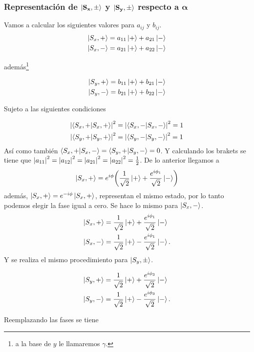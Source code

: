 \subsubsection{Representación de $\mathbf{\ket{S_x,\pm}}$ y $\mathbf{\ket{S_y, \pm}}$ respecto a $\mathbf{\alpha}$}
Vamos a calcular los siguientes valores para $a_{ij}$ y $b_{ij}$.
\begin{align*}
	\ket{S_{x} ,+} &= a_{11} \ket{+} + a_{21} \ket{-} \\
	\ket{S_{x} ,-} &= a_{21} \ket{+} + a_{22} \ket{-}
\end{align*}

además\footnote{a la base de $y$ le llamaremos $\gamma$.}

\begin{align*}
	\ket{S_{y} ,+} &= b_{11} \ket{+} + b_{21} \ket{-} \\
	\ket{S_{y} ,-} &= b_{21} \ket{+} + b_{22} \ket{-}
\end{align*}

Sujeto a las siguientes condiciones

\begin{align*}
	\abs{\braket{S_x, +}}^2 &= \abs{\braket{S_x, -}}^2 = 1 \\
	\abs{\braket{S_y, +}}^2 &= \abs{\braket{S_y, -}}^2 = 1
\end{align*}
Así como también $\braket{S_x,+}{S_x,-} = \braket{S_y,+}{S_y,-} = 0$. Y calculando los brakets se tiene que $\abs{a_{11}}^2 = \abs{a_{12}}^2 = \abs{a_{21}}^2 = \abs{a_{22}}^2 = \frac{1}{2}$. De lo anterior llegamos a
	$$ \ket{S_{x} ,+} = e^{i\phi} \qty(\frac{1}{\sqrt{2}} \ket{+} + \frac{e^{i\phi _1}}{\sqrt{2}} \ket{-}) $$
además, $\ket{S_{x} ,+} = e^{-i\phi} \ket{S_{x} ,+}$, representan el mismo estado, por lo tanto podemos elegir la fase igual a cero. Se hace lo mismo para $\ket{S_{x} ,-}$.
\begin{align}
	\ket{S_{x} ,+} &= \frac{1}{\sqrt{2}} \ket{+} + \frac{e^{i\phi _1}}{\sqrt{2}} \ket{-} \\
	\ket{S_{x} ,-} &= \frac{1}{\sqrt{2}} \ket{+} - \frac{e^{i\phi _1}}{\sqrt{2}} \ket{-} .
\end{align}
Y se realiza el mismo procedimiento para $\ket{S_y, \pm}$.

\begin{align}
	\ket{S_{y} ,+} &= \frac{1}{\sqrt{2}} \ket{+} + \frac{e^{i\phi _3}}{\sqrt{2}} \ket{-} \\
	\ket{S_{y} ,-} &= \frac{1}{\sqrt{2}} \ket{+} - \frac{e^{i\phi _3}}{\sqrt{2}} \ket{-} .
\end{align}

Reemplazando las fases se tiene

